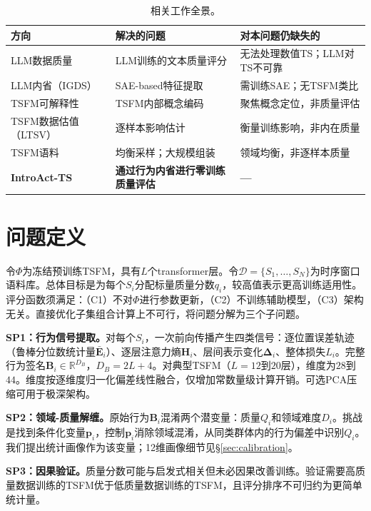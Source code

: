 \documentclass{article}
\begin{document}
\begin{table}[t]
\centering
\caption{相关工作全景。}
\label{tab:related_work}
\begin{tabular}{p{3.3cm}p{5.5cm}p{5.2cm}}
\toprule
\textbf{方向} & \textbf{解决的问题} & \textbf{对本问题仍缺失的} \\
\midrule
LLM数据质量 & LLM训练的文本质量评分 & 无法处理数值TS；LLM对TS不可靠 \\
LLM内省（IGDS） & SAE-based特征提取 & 需训练SAE；无TSFM类比 \\
TSFM可解释性 & TSFM内部概念编码 & 聚焦概念定位，非质量评估 \\
TSFM数据估值（LTSV） & 逐样本影响估计 & 衡量训练影响，非内在质量 \\
TSFM语料 & 均衡采样；大规模组装 & 领域均衡，非逐样本质量 \\
\textbf{IntroAct-TS} & \textbf{通过行为内省进行零训练质量评估} & \textbf{---} \\
\bottomrule
\end{tabular}
\end{table}

\section{问题定义}
\label{sec:problem}

令$\Phi$为冻结预训练TSFM，具有$L$个transformer层。令$\mathcal{D} = \{S_1, \ldots, S_N\}$为时序窗口语料库。总体目标是为每个$S_i$分配标量质量分数$q_i$，较高值表示更高训练适用性。评分函数须满足：（C1）不对$\Phi$进行参数更新，（C2）不训练辅助模型，（C3）架构无关。直接优化子集组合计算上不可行，将问题分解为三个子问题。

\textbf{SP1：行为信号提取。}对每个$S_i$，一次前向传播产生四类信号：逐位置误差轨迹（鲁棒分位数统计量$\bar{\mathbf{E}}_i$）、逐层注意力熵$\mathbf{H}_i$、层间表示变化$\boldsymbol{\Delta}_i$、整体损失$L_i$。完整行为签名$\mathbf{B}_i \in \mathbb{R}^{D_B}$，$D_B = 2L + 4$。对典型TSFM（$L = 12$到$20$层），维度为$28$到$44$。维度按逐维度归一化偏差线性融合，仅增加常数量级计算开销。可选PCA压缩可用于极深架构。

\textbf{SP2：领域-质量解缠。}原始行为$\mathbf{B}_i$混淆两个潜变量：质量$Q_i$和领域难度$D_i$。挑战是找到条件化变量$\mathbf{p}_i$，控制$\mathbf{p}_i$消除领域混淆，从同类群体内的行为偏差中识别$Q_i$。我们提出统计画像作为该变量；12维画像细节见\S\ref{sec:calibration}。

\textbf{SP3：因果验证。}质量分数可能与启发式相关但未必因果改善训练。验证需要高质量数据训练的TSFM优于低质量数据训练的TSFM，且评分排序不可归约为更简单统计量。
\end{document}
